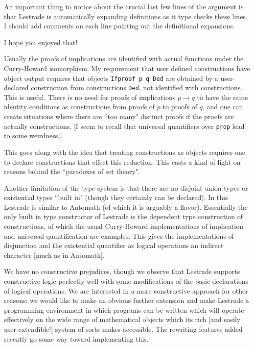 \documentclass[12pt]{article}
\begin{document}
An important thing to notice about the crucial last few lines of the argument is that Lestrade is automatically expanding definitions as it type checks these lines.  I should add comments on each line pointing out the definitional expansions.

I hope you enjoyed that!

Usually the proofs of implications are identified with actual functions under the Curry-Howard isomorphism.    My requirement that user defined constructions have object
output requires that objects {\tt Ifproof p q Ded} are obtained by a user-declared construction from constructions  {\tt Ded}, not identified with constructions.  This is useful.
There is no need for proofs of implications $p \rightarrow q$ to have the same identity conditions as constructions from proofs of $p$ to proofs of $q$, and one can
create situations where there are ``too many" distinct proofs if the proofs are actually constructions.  [I seem to recall that universal quantifiers over {\tt prop} lead to some weirdness.]

This goes along with the idea that treating constructions as objects requires one to declare constructions that effect this reduction.  This casts a kind of light on reasons behind the ``paradoxes of set theory".

Another limitation of the type system is that there are no disjoint union types or existential types ``built in" (though they certainly can be declared).  In this Lestrade is similar to Automath (of which it is arguably a flavor).  Essentially the only built in type constructor of Lestrade is the dependent type construction of constructions, of which the usual Curry-Howard implementations of implication and universal quantification are examples.  This gives the implementations of disjunction and the existential quantifier as logical operations an indirect character [much as in Automath].

We have no constructive prejudices, though we observe that Lestrade supports constructive logic perfectly well with some modifications of the basic declarations of logical operations.  We are interested in a more constructive approach for other reasons:  we would like to make an obvious further extension and make Lestrade a programming environment in which programs can be written which will operate effectively on the wide range of mathematical objects which its rich [and easily user-extendible!]  system of sorts makes accessible.  The rewriting features added recently go some way toward implementing this.
\end{document}
